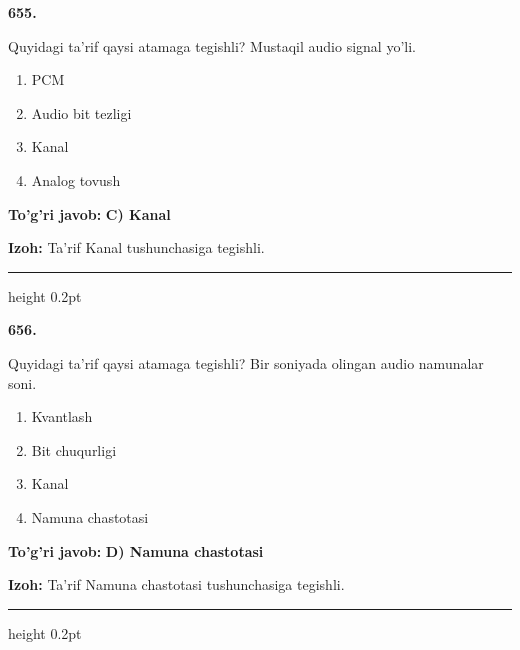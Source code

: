 \documentclass[10pt,a4paper,oneside]{article}
\begin{document}
\noindent\textbf{\color{ink}655.}
\par
Quyidagi ta'rif qaysi atamaga tegishli? Mustaqil audio signal yo'li.
\begin{enumerate}[label=\Alph*),leftmargin=9mm]
\item PCM
\item Audio bit tezligi
\item Kanal
\item Analog tovush
\end{enumerate}
\begin{tcolorbox}[enhanced,breakable,colback=teal!4,colframe=teal!50!black,boxrule=0.5pt,arc=1.1mm,left=3mm,right=3mm,top=1.7mm,bottom=1.7mm,before skip=2mm,after skip=2mm]
\textbf{\color{teal}To'g'ri javob:} \textbf{C) Kanal}
\par\smallskip
\textbf{Izoh:} Ta'rif Kanal tushunchasiga tegishli.
\end{tcolorbox}
\vspace{2mm}\hrule height 0.2pt \vspace{3mm}

\noindent\textbf{\color{ink}656.}
\par
Quyidagi ta'rif qaysi atamaga tegishli? Bir soniyada olingan audio namunalar soni.
\begin{enumerate}[label=\Alph*),leftmargin=9mm]
\item Kvantlash
\item Bit chuqurligi
\item Kanal
\item Namuna chastotasi
\end{enumerate}
\begin{tcolorbox}[enhanced,breakable,colback=teal!4,colframe=teal!50!black,boxrule=0.5pt,arc=1.1mm,left=3mm,right=3mm,top=1.7mm,bottom=1.7mm,before skip=2mm,after skip=2mm]
\textbf{\color{teal}To'g'ri javob:} \textbf{D) Namuna chastotasi}
\par\smallskip
\textbf{Izoh:} Ta'rif Namuna chastotasi tushunchasiga tegishli.
\end{tcolorbox}
\vspace{2mm}\hrule height 0.2pt \vspace{3mm}
\end{document}
